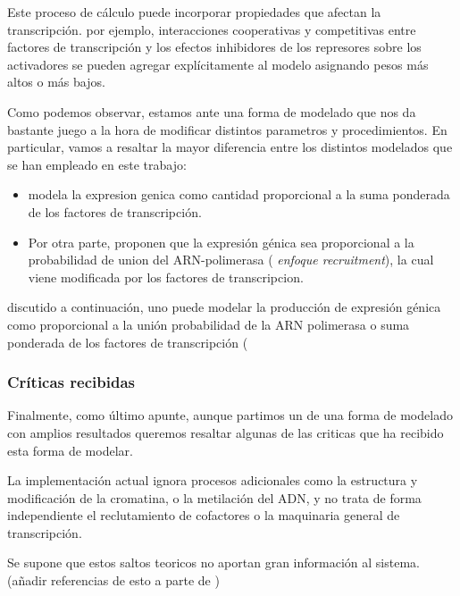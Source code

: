  
 Este proceso de cálculo puede incorporar propiedades que afectan la transcripción. por ejemplo, interacciones cooperativas y competitivas entre factores de transcripción y los efectos inhibidores de los represores sobre los activadores se pueden agregar explícitamente al modelo asignando pesos más altos o más bajos.
 
 Como podemos observar, estamos ante una forma de modelado que nos da bastante juego a la hora de modificar distintos parametros y procedimientos. En particular, vamos a resaltar la mayor diferencia entre los distintos modelados que se han empleado en este trabajo:
 \begin{itemize}
 	\item \cite{schaffer} modela la expresion genica como cantidad proporcional a la suma ponderada de los factores de transcripción.
 	\item Por otra parte, \cite{cambon1} proponen que la expresión génica sea proporcional a la probabilidad de union del ARN-polimerasa (\textit{ enfoque recruitment}), la cual viene modificada por los factores de transcripcion.
 		
 		
 	\end{itemize}
 discutido a continuación, uno puede modelar la producción de expresión génica como proporcional a la unión
 probabilidad de la ARN polimerasa o suma ponderada de los factores de transcripción (
 
 
 
 
 \subsubsection{Críticas recibidas}
 
 
 Finalmente, como último apunte, aunque partimos un de una forma de modelado con amplios resultados queremos resaltar algunas de las criticas que ha recibido esta forma de modelar.
 
 La implementación actual ignora procesos adicionales como la estructura y modificación de la cromatina, o la metilación del ADN, y no trata de forma independiente el reclutamiento de cofactores o la maquinaria general de transcripción.
 
  Se supone que estos saltos teoricos no aportan gran información al sistema. (añadir referencias de esto a parte de \cite{ay2011mathematical})